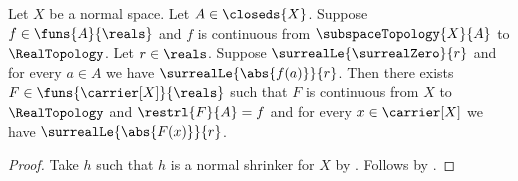 \begin{theorem}\label{tietze_extension_bounded_real}
    Let $X$ be a normal space.
    Let $A\in\closeds{X}$.
    Suppose $f\in\funs{A}{\reals}$ and $f$ is continuous from
        $\subspaceTopology{X}{A}$ to $\RealTopology$.
    Let $r\in\reals$.
    Suppose $\surrealLe{\surrealZero}{r}$ and
        for every $a\in A$ we have $\surrealLe{\abs{f(a)}}{r}$.
    Then there exists $F\in\funs{\carrier[X]}{\reals}$ such that
        $F$ is continuous from $X$ to $\RealTopology$ and
        $\restrl{F}{A}=f$ and
        for every $x\in\carrier[X]$ we have
            $\surrealLe{\abs{F(x)}}{r}$.
\end{theorem}
\begin{proof}
    Take $h$ such that $h$ is a normal shrinker for $X$
        by .
    Follows by
        .
\end{proof}
